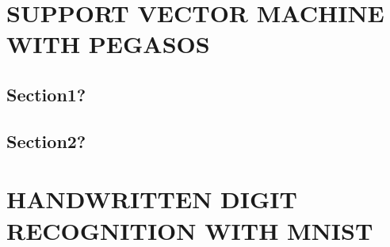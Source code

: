 \documentclass[a4paper,twoside]{article}
\begin{document}

\section{\uppercase{Support Vector Machine with Pegasos}}

\subsection{Section1?}


\subsection{Section2?}



\section{\uppercase{Handwritten Digit Recognition with MNIST}}


\vfill
\end{document}
